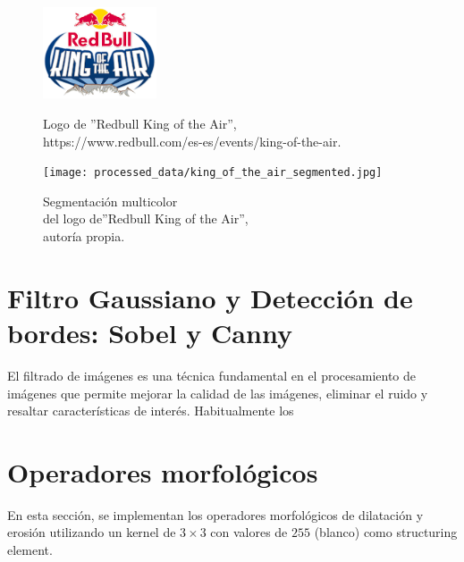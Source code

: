 \documentclass[a4paper,12pt]{article}
\begin{document}
{\begin{figure}[H]
\end{figure}

\begin{figure}[H]
  
  \begin{minipage}[t]{0.6\textwidth}
    \includegraphics[width=0.3\textwidth]{data/king_of_the_air.png}
    \caption{Logo de ''Redbull King of the Air'',\\https://www.redbull.com/es-es/events/king-of-the-air.}
    \label{fig:redbull_original}
  \end{minipage}
  \hfill
  \hspace{1.5cm}
  \begin{minipage}[t]{0.6\textwidth}
    \texttt{[image: processed\_data/king\_of\_the\_air\_segmented.jpg]}
    \caption{Segmentación multicolor\\del logo de''Redbull King of the Air'',\\ autoría propia.}
    \label{fig:redbull_segmentation}
  \end{minipage}

\end{figure}


\section{Filtro Gaussiano y Detección de bordes: Sobel y Canny}


\vspace{1cm}

El filtrado de imágenes es una técnica fundamental en el procesamiento de imágenes que permite mejorar la calidad de las imágenes, eliminar el ruido y resaltar 
características de interés. Habitualmente los

\section{Operadores morfológicos}

En esta sección, se implementan los operadores morfológicos de dilatación y erosión
utilizando un kernel de \(3 \times 3\) con valores de \(255\) (blanco) como structuring element. 

}
\end{document}
